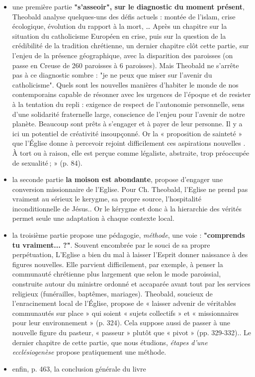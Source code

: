 \begin{itemize}
    \item une première partie \textbf{"s'asseoir", sur le diagnostic du moment présent},  Theobald analyse quelques-uns des défis actuels : montée de l’islam, crise écologique, évolution du rapport à la mort, \ldots
    Après un chapitre sur la situation du catholicisme Européen en crise, puis sur  la question de la crédibilité de la tradition chrétienne,  un dernier chapitre clôt cette partie, sur l'enjeu de la présence géographique, avec la disparition des paroisses (on passe en Creuse de 260 paroisses à 6 paroisses). Mais Theobald ne s'arrête pas à ce diagnostic sombre : "je ne peux que miser sur l'avenir du catholicisme".   Quels sont les nouvelles manières d’habiter le monde de nos contemporains capable de résonner avec les urgences de l’époque et de resister à la tentation du repli : exigence de respect de l’autonomie personnelle,  sens d’une solidarité fraternelle large,  conscience de l'enjeu pour l’avenir de notre planète. Beaucoup  sont prêts à s’engager et à payer de leur personne. Il y a ici un potentiel de créativité insoupçonné. Or la « proposition de sainteté » que l’Église donne à percevoir rejoint difficilement ces aspirations nouvelles . À tort ou à raison, elle est perçue comme légaliste, abstraite, trop préoccupée de sexualité ;  » (p. 84). 
    
    \item la seconde partie \textbf{la moison est abondante}, {propose d'engager une conversion} missionnaire de l'Eglise. Pour Ch. Theobald, 
l'Eglise ne prend pas vraiment au sérieux le kerygme, sa propre source, l'hospitalité inconditionnelle de Jésus.\cite{etienne_grieu_leglise_nodate}.  Or le  kérygme et donc à la hierarchie des vérités  permet seule une adaptation à chaque contexte local.
    \item la troisième partie propose une pédagogie, \textit{méthode}, une voie : \textbf{"comprends tu vraiment... ?"}. 
 Souvent encombrée par le souci de sa propre perpétuation, L'Eglise a bien du mal à laisser l’Esprit donner naissance à des figures nouvelles. Elle parvient difficilement, par exemple, à penser la communauté chrétienne plus largement que selon le mode paroissial, construite autour du ministre ordonné et accaparée avant tout par les services religieux (funérailles, baptêmes, mariages). Theobald, soucieux de l’enracinement local de l’Église, propose de « laisser advenir de véritables communautés sur place » qui soient « sujets collectifs » et « missionnaires pour leur environnement » (p. 324). Cela suppose aussi de passer à une nouvelle figure du pasteur, « passeur » plutôt que « pivot » (pp. 329-332).\cite{etienne_grieu_leglise_nodate}. Le dernier chapitre de cette partie, que nous étudions, \textit{étapes d'une ecclésiogenèse} propose pratiquement une méthode.
    \item enfin, p. 463, la conclusion générale du livre
\end{itemize}



